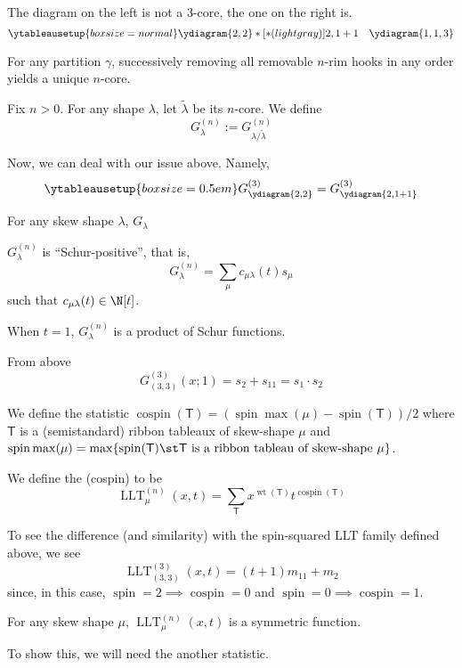 \documentclass[11pt,leqno,oneside]{amsart}
\numberwithin{thm}{section}
\newcommand{\T}{\mathsf{T}} %
\newcommand{\spin}{\operatorname{spin}}
\newcommand{\cospin}{\operatorname{cospin}}
\newcommand{\wt}{\operatorname{wt}}
\newcommand{\LLT}{\operatorname{LLT}}
\begin{document}
\begin{example}
  The diagram on the left is not a \(3\)-core, the one on the right is.
  \[
    \ytableausetup{boxsize=normal} \ydiagram{2,2}*[*(lightgray)]{2,1+1} \ \ \ \ydiagram{1,1,3}
  \]
\end{example}
\begin{prop}
  For any partition \(\gamma\), successively removing all removable
  \(n\)-rim hooks in any order yields a unique \(n\)-core.
\end{prop}
\begin{defn}
  Fix \(n > 0\). For any shape \(\lambda\), let \(\tilde{\lambda}\) be
  its \(n\)-core. We define \[
    G_\lambda^{(n)} := G_{\lambda/\tilde{\lambda}}^{(n)}
  \]
\end{defn}
\begin{example}
  Now, we can deal with our issue above. Namely, \[
  \ytableausetup{boxsize=0.5em}G_{\ydiagram{2,2}}^{(3)} = G_{\ydiagram{2,1+1}}^{(3)}
  \]
\end{example}
\begin{prop}
  For any skew shape \(\lambda\), \(G_\lambda\)
\end{prop}
\begin{prop}
  \(G_\lambda^{(n)}\) is ``Schur-positive'', that is, \[
    G_\lambda^{(n)} = \sum_\mu c_{\mu \lambda}(t) s_\mu
  \]
  such that \(c_{\mu \lambda}(t) \in \N[t]\). 
\end{prop}
\begin{prop}
  When \(t=1\), \(G_\lambda^{(n)}\) is a product of Schur functions.
\end{prop}
\begin{example}
  From above\[
    G_{(3,3)}^{(3)}(x;1) = s_2+s_{11} = s_1 \cdot s_2
  \]
\end{example}
\begin{defn}
  We define the statistic \(\cospin(\T) = (\spin\max(\mu) -
  \spin(\T))/2\) where \(\T\) is a (semistandard) ribbon tableaux of
  skew-shape \(\mu\) and \(\spin\max(\mu) = \max\{\spin(\T) \st \T
  \text{ is a ribbon tableau of skew-shape }\mu\}\).
\end{defn}
\begin{defn}
  We define the (cospin)  to be \[
    \LLT_\mu^{(n)}(x,t) = \sum_{\T} x^{\wt(\T)} t^{\cospin(\T)}
  \]
\end{defn}
\begin{example}
  To see the difference (and similarity) with the spin-squared LLT family defined
  above, we see \[
    \LLT_{(3,3)}^{(3)}(x,t) = (t+1)m_{11} + m_2
  \]
  since, in this case, \(\spin = 2 \implies \cospin = 0\) and \(\spin
  = 0 \implies \cospin = 1\).
\end{example}
\begin{prop}
  For any skew shape \(\mu\), \(\LLT_\mu^{(n)}(x,t)\) is a symmetric
  function. 
\end{prop}
To show this, we will need the another statistic.
\end{document}
